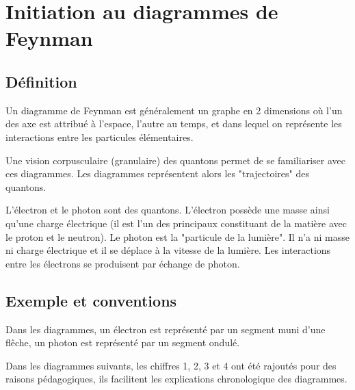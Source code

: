 

\section{Initiation au diagrammes de Feynman \cite{diagrammesFeynman}}


\label{JeanLucDeziel}

\subsection{Définition}

Un diagramme de Feynman est généralement un graphe en 2 dimensions où l'un des axe est attribué à l'espace, l'autre au temps, et dans lequel on représente les interactions entre les particules élémentaires. 



Une vision corpusculaire (granulaire) des quantons permet de se familiariser avec ces diagrammes. Les diagrammes représentent alors les "trajectoires" des quantons.

L'électron et le photon sont des quantons. L'électron possède une masse ainsi qu'une charge électrique (il est l'un des principaux constituant de la matière avec le proton et le neutron). Le photon est la "particule de la lumière". Il n'a ni masse ni charge électrique et il se déplace à la vitesse de la lumière. Les interactions entre les électrons se produisent par échange de photon.


\subsection{Exemple et conventions}

Dans les diagrammes, un électron est représenté par un segment muni d'une flêche, un photon est représenté par un segment ondulé.

Dans les diagrammes suivants, les chiffres 1, 2, 3 et 4 ont été rajoutés pour des raisons pédagogiques, ils facilitent les explications chronologique des diagrammes.
\vspace{0.9cm}


